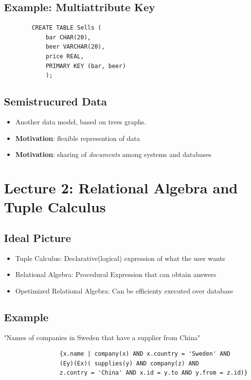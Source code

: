 \documentclass[a4paper]{article}
\begin{document}
    \subsection{Example: Multiattribute Key}
    \begin{verbatim}
        CREATE TABLE Sells (
            bar CHAR(20),
            beer VARCHAR(20),
            price REAL,
            PRIMARY KEY (bar, beer) 
            );
    \end{verbatim}
    \subsection{Semistrucured Data}
        \begin{itemize}
            \item Another data model, based on trees graphs.
            \item \textbf{Motivation}: flexible represention of data
            \item \textbf{Motivation}: sharing of \textit{documents} among systems and databases
        \end{itemize}


    \newpage

    \section{Lecture 2: Relational Algebra and Tuple Calculus}
        \subsection{Ideal Picture}
            \begin{itemize}
                \item Tuple Calculus: Declarative(logical) expression of what the user wants
                \item Relational Algebra: Procedural Expression that can obtain answers
                \item Opetimized Relational Algebra: Can be efficienty executed over database
            \end{itemize}
        \subsection{Example}
        "Names of companies in Sweden that have a supplier from China"
            \begin{verbatim}
                {x.name | company(x) AND x.country = 'Sweden' AND
                (Ey)(Ex)( supplies(y) AND company(z) AND 
                z.contry = 'China' AND x.id = y.to AND y.from = z.id)}
            \end{verbatim}
\end{document}

